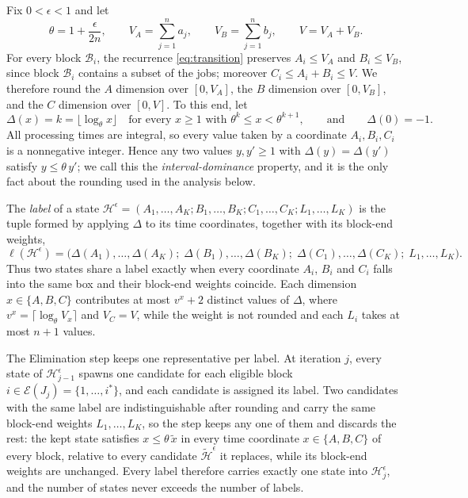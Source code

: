 \documentclass[12pt]{article}
\begin{document}
\begin{sloppypar}
        Fix $0<\epsilon<1$ and let
        \[
        \theta=1+\frac{\epsilon}{2n},\qquad
        V_A=\sum_{j=1}^{n}a_j,\qquad
        V_B=\sum_{j=1}^{n}b_j,\qquad
        V=V_A+V_B.
        \]
        For every block $\mathcal{B}_i$, the recurrence \cref{eq:transition}
        preserves $A_i\le V_A$ and $B_i\le V_B$, since block $\mathcal{B}_i$ contains a
        subset of the jobs; moreover $C_i\le A_i+B_i\le V$. We therefore round the $A$
        dimension over $[0,V_A]$, the $B$ dimension over $[0,V_B]$, and the $C$
        dimension over $[0,V]$. To this end, let
        \[
        \Delta(x)=k=\big\lfloor\log_\theta x\big\rfloor
        \quad\text{for every }x\ge 1\text{ with }\theta^{k}\le x<\theta^{k+1},
        \qquad\text{and}\qquad \Delta(0)=-1 .
        \]
        All processing times are integral, so every value taken by a coordinate
        $A_i,B_i,C_i$ is a nonnegative integer. Hence any two values $y,y'\ge1$ with
        $\Delta(y)=\Delta(y')$ satisfy $y\le\theta\,y'$; we call this the
        \emph{interval-dominance} property, and it is the only fact about the rounding
        used in the analysis below.
        
        The \emph{label} of a
        state $\mathscr{H}^{\epsilon}=(A_1,\dots,A_K; B_1,\dots,B_K; C_1,\dots,C_K; L_1,\dots,L_K)$
        is the tuple formed by applying $\Delta$ to its time coordinates, together with its block-end weights,
        \[
        \ell(\mathscr{H}^{\epsilon})=
        \bigl(\Delta(A_1),\dots,\Delta(A_K);\;
        \Delta(B_1),\dots,\Delta(B_K);\;
        \Delta(C_1),\dots,\Delta(C_K);\;
        L_1,\dots,L_K\bigr).
        \]
        Thus two states share a label exactly when every coordinate $A_i$, $B_i$ and
        $C_i$ falls into the same box and their block-end weights coincide. Each dimension
        $x\in\{A,B,C\}$ contributes at
        most $v^{x}+2$ distinct values of $\Delta$, where
        $v^{x}=\lceil\log_\theta V_x\rceil$ and $V_C=V$, while the weight is not rounded and
        each $L_i$ takes at most $n+1$ values.
        
        The Elimination step keeps one representative per label. At iteration $j$, every state of
        $\mathscr{H}^{\epsilon}_{j-1}$ spawns one candidate for each eligible block
        $i\in\mathcal{E}(J_j)=\{1,\dots,i^{*}\}$, and each candidate is assigned its label. Two
        candidates with the same label are indistinguishable after rounding and carry the same
        block-end weights $L_1,\dots,L_K$, so the step keeps any one of them and discards the rest:
        the kept state satisfies $x\le\theta\,\tilde x$ in every time coordinate $x\in\{A,B,C\}$ of every
        block, relative to every candidate $\tilde{\mathscr{H}}^{\epsilon}$ it replaces, while its
        block-end weights are unchanged. Every
        label therefore carries exactly one state into $\mathscr{H}^{\epsilon}_{j}$, and the number of
        states never exceeds the number of labels.
        

\end{sloppypar}
\end{document}
